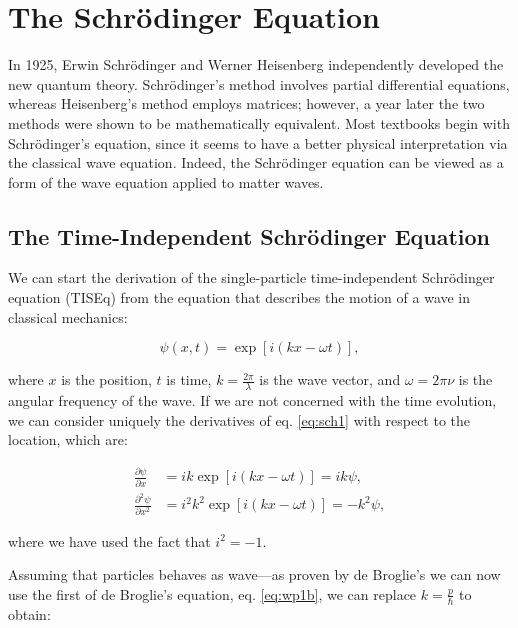\documentclass[
  9pt,
]{extbook}
\theoremstyle{definition}
\theoremstyle{definition}
\theoremstyle{definition}
\theoremstyle{remark}
\begin{document}
\hypertarget{Schrodinger}{%
\chapter{The Schrödinger Equation}\label{Schrodinger}}

In 1925, Erwin Schrödinger and Werner Heisenberg independently developed the new quantum theory. Schrödinger's method involves partial differential equations, whereas Heisenberg's method employs matrices; however, a year later the two methods were shown to be mathematically equivalent. Most textbooks begin with Schrödinger's equation, since it seems to have a better physical interpretation via the classical wave equation. Indeed, the Schrödinger equation can be viewed as a form of the wave equation applied to matter waves.

\hypertarget{the-time-independent-schruxf6dinger-equation}{%
\section{The Time-Independent Schrödinger Equation}\label{the-time-independent-schruxf6dinger-equation}}

We can start the derivation of the single-particle time-independent Schrödinger equation (TISEq) from the equation that describes the motion of a wave in classical mechanics:

\begin{equation}
\psi(x,t)=\exp[i(kx-\omega t)],
\label{eq:sch1}
\end{equation}

where \(x\) is the position, \(t\) is time, \(k=\frac{2\pi}{\lambda}\) is the wave vector, and \(\omega=2\pi\nu\) is the angular frequency of the wave. If we are not concerned with the time evolution, we can consider uniquely the derivatives of eq. \eqref{eq:sch1} with respect to the location, which are:

\begin{equation}
\begin{aligned}
\frac{\partial \psi}{\partial x} &=ik\exp[i(kx-\omega t)] = ik\psi, \\
\frac{\partial^2 \psi}{\partial x^2} &=i^2k^2\exp[i(kx-\omega t)] = -k^2\psi,
\end{aligned}
\label{eq:sch2}
\end{equation}

where we have used the fact that \(i^2=-1\).

Assuming that particles behaves as wave---as proven by de Broglie's we can now use the first of de Broglie's equation, eq. \eqref{eq:wp1b}, we can replace \(k=\frac{p}{\hbar}\) to obtain:
\end{document}
